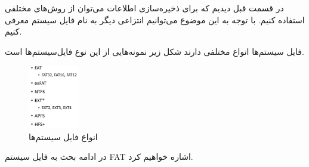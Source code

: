 \begin{flushright}
    در قسمت قبل دیدیم که برای ذخیره‌سازی اطلاعات می‌توان از روش‌های مختلفی استفاده کنیم.
    با توجه به این موضوع می‌توانیم انتزاعی دیگر به نام فایل سیستم معرفی کنیم.

فایل سیستم‌ها انواع مختلفی دارند شکل زیر نمونه‌هایی از این نوع فایل‌سیستم‌ها است.

    \begin{figure}[H]
        \centering
        \includegraphics[width=0.2\textwidth]{source/file-system-examples}
        \caption{انواع فایل سیستم‌ها}
        \label{fig:file-system-examples}
    \end{figure}

    در ادامه بحث به فایل سیستم FAT اشاره خواهیم کرد.

\end{flushright}